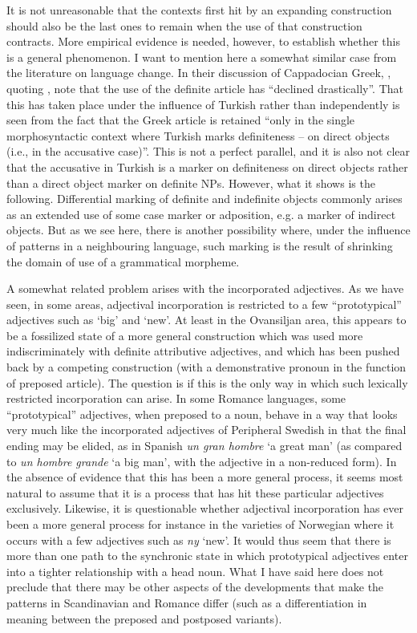 It is not unreasonable that the contexts first hit by an expanding construction should also be the last ones to remain when the use of that construction contracts. More empirical evidence is needed, however, to establish whether this is a general phenomenon. I want to mention here a somewhat similar case from the literature on language change. In their discussion of Cappadocian Greek, \citet{ThomasonEtAl}, quoting \citet{Dawkins1916}, note that the use of the definite article has “declined drastically”. That this has taken place under the influence of Turkish rather than independently is seen from the fact that the Greek article is retained “only in the single morphosyntactic context where Turkish marks definiteness – on direct objects (i.e., in the accusative case)”. This is not a perfect parallel, and it is also not clear that the accusative in Turkish is a marker on definiteness on direct objects rather than a direct object marker on definite NPs. However, what it shows is the following. Differential marking of definite and indefinite objects commonly arises as an extended use of some case marker or adposition, e.g. a marker of indirect objects. But as we see here, there is another possibility where, under the influence of patterns in a neighbouring language, such marking is the result of shrinking the domain of use of a grammatical morpheme. 

A somewhat related problem arises with the incorporated adjectives. As we have seen, in some areas, adjectival incorporation is restricted to a few “prototypical” adjectives such as ‘big’ and ‘new’. At least in the Ovansiljan area, this appears to be a fossilized state of a more general construction which was used more indiscriminately with definite attributive adjectives, and which has been pushed back by a competing construction (with a demonstrative pronoun in the function of preposed article). The question is if this is the only way in which such lexically restricted incorporation can arise. In some Romance languages, some “prototypical” adjectives, when preposed to a noun, behave in a way that looks very much like the incorporated adjectives of Peripheral Swedish in that the final ending may be elided, as in Spanish \textit{un gran hombre} ‘a great man’ (as compared to \textit{un hombre grande }‘a big man’, with the adjective in a non-reduced form). In the absence of evidence that this has been a more general process, it seems most natural to assume that it is a process that has hit these particular adjectives exclusively. Likewise, it is questionable whether adjectival incorporation has ever been a more general process for instance in the varieties of Norwegian where it occurs with a few adjectives such as \textit{ny} ‘new’. It would thus seem that there is more than one path to the synchronic state in which prototypical adjectives enter into a tighter relationship with a head noun. What I have said here does not preclude that there may be other aspects of the developments that make the patterns in Scandinavian and Romance differ (such as a differentiation in meaning between the preposed and postposed variants). 

